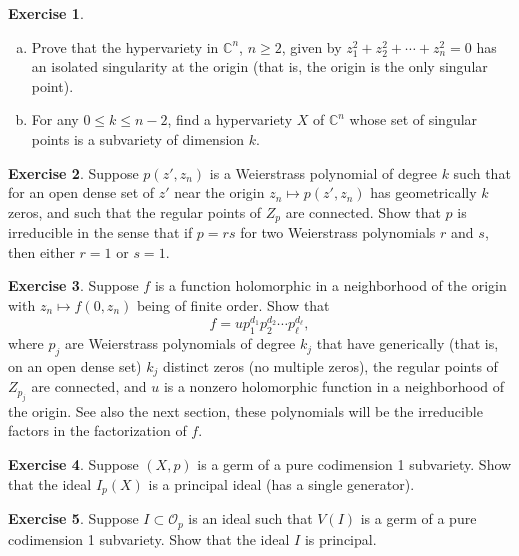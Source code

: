 \documentclass[12pt,openany]{book}
\newcommand{\C}{{\mathbb{C}}}
\newcommand{\sO}{{\mathscr{O}}}
\theoremstyle{plain}
\theoremstyle{remark}
\theoremstyle{definition}
\newenvironment{exbox}{%
    \def\FrameCommand{\vrule width 1pt \relax\hspace{10pt}}%
    \MakeFramed{\advance\hsize-\width\FrameRestore}%
}{%
    \endMakeFramed
}
\newenvironment{exparts}{%
    \leavevmode\begin{enumerate}[a),noitemsep,topsep=0pt,parsep=0pt,partopsep=0pt]
}{%
    \end{enumerate}
}
\theoremstyle{exercise}
\newtheorem{exercise}{Exercise}[section]
\theoremstyle{example}
\begin{document}
\begin{exbox}
\begin{exercise}
\begin{exparts}
\item
Prove that the hypervariety in $\C^n$, $n \geq 2$, given by $z_1^2 + z_2^2 + \cdots + z_n^2 = 0$
has an isolated singularity at the origin (that is, the origin is the only
singular point).
\item
For any $0 \leq k \leq n-2$, find a hypervariety $X$ of $\C^n$ whose set
of singular points is a subvariety of dimension $k$.
\end{exparts}
\end{exercise}

\begin{exercise}
Suppose $p(z',z_n)$ is a Weierstrass polynomial of degree $k$ such that
for an open dense set of $z'$ near the origin 
$z_n \mapsto p(z',z_n)$ has geometrically $k$ zeros, and such that the
regular points of $Z_p$ are connected.  Show that $p$ is
irreducible in the sense that if $p = rs$ for two Weierstrass polynomials
$r$ and $s$, then either $r=1$ or $s=1$.
\end{exercise}

\begin{samepage}
\begin{exercise}
Suppose $f$ is a function holomorphic in a neighborhood of the origin with
$z_n \mapsto f(0,z_n)$ being of finite order.  Show that
\begin{equation*}
f = u p_1^{d_1} p_2^{d_2} \cdots p_\ell^{d_\ell} ,
\end{equation*}
where $p_j$ are Weierstrass polynomials of degree $k_j$ that have
generically (that is, on an open dense set) $k_j$ distinct zeros
(no multiple zeros), the regular points of $Z_{p_j}$ are
connected, and $u$ is a nonzero holomorphic function
in a neighborhood of the origin.  See also the next section, these
polynomials will be the irreducible factors in the factorization of $f$.
\end{exercise}
\end{samepage}

\begin{exercise}
Suppose $(X,p)$ is a germ of a pure codimension 1 subvariety.  Show that
the ideal $I_p(X)$ is a principal ideal (has a single generator).
\end{exercise}

\begin{exercise}
Suppose $I \subset \sO_p$ is an ideal such that $V(I)$ is a germ of a pure codimension 1 subvariety.  Show that
the ideal $I$ is principal.
\end{exercise}


\end{exbox}
\end{document}
